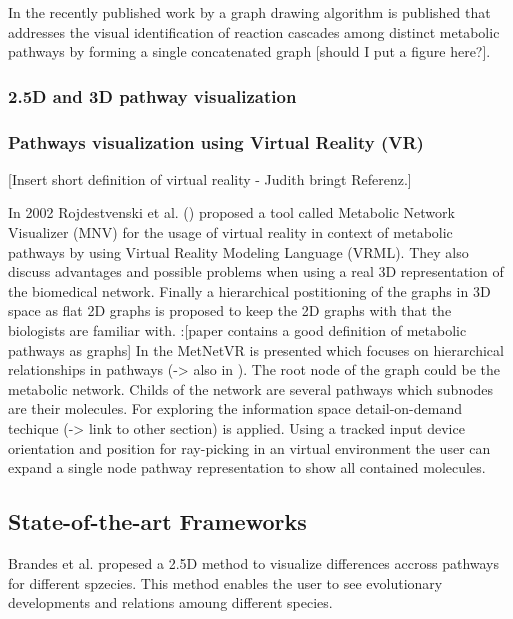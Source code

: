 In the recently published work by \citep{Bourqui2006} a graph drawing algorithm is published that addresses the visual identification of reaction cascades among distinct metabolic pathways by forming a single concatenated graph [should I put a figure here?].

\subsubsection{2.5D and 3D pathway visualization}


\subsubsection{Pathways visualization using Virtual Reality (VR)}

[Insert short definition of virtual reality - Judith bringt Referenz.]

In 2002 Rojdestvenski et al. (\citep{Rojdestvenski2002, Rojdestvenski2003}) proposed a tool called Metabolic Network Visualizer (MNV) for the usage of virtual reality in context of metabolic pathways by using Virtual Reality Modeling Language (VRML). They also discuss advantages and possible problems when using a real 3D representation of the biomedical network. Finally a hierarchical postitioning of the graphs in 3D space as flat 2D graphs is proposed to keep the 2D graphs with that the biologists are familiar with. 
\citep{Dickerson2003}:[paper contains a good definition of metabolic pathways as graphs]
In \citep{Yang2006} the MetNetVR is presented which focuses on hierarchical relationships in pathways (-> also in \citep{Dogrusoz2004}). The root node of the graph could
be the metabolic network. Childs of the network are several pathways which subnodes are their molecules. For exploring the information space detail-on-demand techique (-> link to other section) is applied. Using a tracked input device orientation and position for  ray-picking in an virtual environment the user can expand a single node pathway representation to show all contained molecules.

\subsection{State-of-the-art Frameworks}

Brandes et al. propesed a 2.5D method to visualize differences accross pathways for different spzecies\citep{Brandes2004}. This method enables the user to see evolutionary developments and relations amoung different species.

